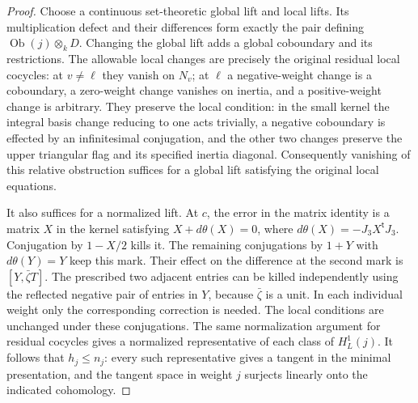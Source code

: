 \begin{proof}
Choose a continuous set-theoretic global lift and local lifts.
Its multiplication defect and their differences form exactly
the pair defining $\operatorname{Ob}(j)\otimes_k D$.
Changing the global lift adds a global coboundary and its
restrictions. The allowable local changes are precisely the
original residual local cocycles: at $v\ne\ell$ they vanish
on $N_v$; at $\ell$ a negative-weight change is a coboundary,
a zero-weight change vanishes on inertia, and a positive-weight
change is arbitrary. They preserve the local condition:
in the small kernel the integral basis change reducing to one
acts trivially, a negative coboundary is effected by an
infinitesimal conjugation, and the other two changes preserve
the upper triangular flag and its specified inertia diagonal.
Consequently vanishing of this relative obstruction suffices for
a global lift satisfying the original local equations.

It also suffices for a normalized lift. At $c$, the error in the
matrix identity is a matrix $X$ in the kernel satisfying
$X+d\theta(X)=0$, where $d\theta(X)=-J_3X^{\mathsf t}J_3$.
Conjugation by $1-X/2$ kills it. The remaining conjugations
by $1+Y$ with $d\theta(Y)=Y$ keep this mark. Their effect on
the difference at the second mark is $[Y,\bar\zeta T]$.
The prescribed two adjacent entries can be killed independently
using the reflected negative pair of entries in $Y$, because
$\bar\zeta$ is a unit. In each individual weight only the
corresponding correction is needed. The local conditions are
unchanged under these conjugations. The same normalization
argument for residual cocycles gives a normalized representative
of each class of $H^1_L(j)$. It follows that $h_j\le n_j$:
every such representative gives a tangent in the minimal
presentation, and the tangent space in weight $j$ surjects
linearly onto the indicated cohomology.


\end{proof}
